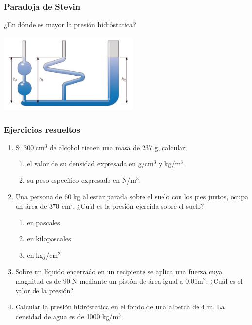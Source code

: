 \documentclass[handout]{beamer}
\begin{document}
\begin{frame}
  \frametitle{Paradoja de Stevin}
  {\large ¿En dónde es mayor la presión hidróstatica?}
  \begin{center}
    \includegraphics[width=7cm]{vasos_comunicantes}
  \end{center}
\end{frame}


\begin{frame}[allowframebreaks,t]
  \frametitle{Ejercicios resueltos}
  \begin{enumerate}
  \item Si 300 cm$^3$ de alcohol tienen una masa de 237 g, calcular;
    \begin{enumerate}
    \item el valor de su densidad expresada en g/cm$^3$ y kg/m$^3$.
    \item su peso específico expresado en N/m$^3$.  
    \end{enumerate}
  \item Una persona de 60 kg al estar parada sobre el suelo con los pies juntos, ocupa un
    área de 370 cm$^2$. ¿Cuál es la presión ejercida sobre el suelo?
    \begin{enumerate}
    \item en pascales.
    \item en kilopascales.
    \item en kg$_{f}$/cm$^2$
    \end{enumerate}
  \item Sobre un líquido encerrado en un recipiente se aplica una fuerza cuya magnitud es
    de 90 N mediante un pistón de área igual a 0.01m$^2$. ¿Cuál es el valor de la presión?
  \item Calcular la presión hidróstatica en el fondo de una alberca de 4 m. La densidad de
    agua es de 1000 kg/m$^3$.
  \end{enumerate}
\end{frame}
\end{document}
